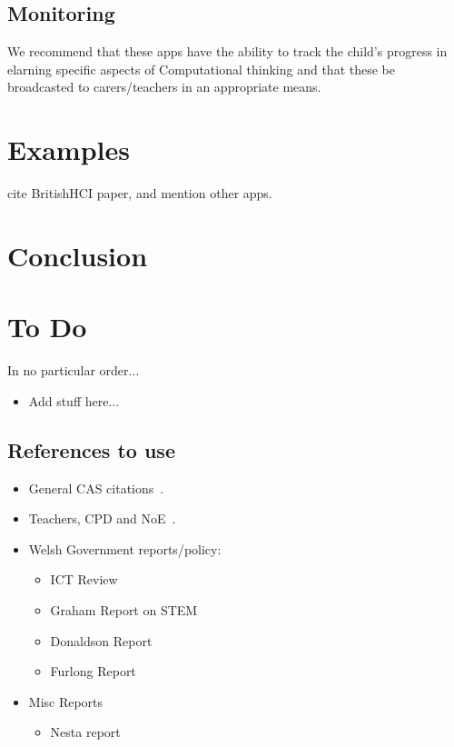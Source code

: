 \documentclass{sig-alternate}
\begin{document}
\subsection*{Monitoring}
We recommend that these apps have the ability to track the child's progress in elarning specific aspects of Computational thinking and that these be broadcasted to carers/teachers in an appropriate means. 

\section{Examples} 
cite BritishHCI paper, and mention other apps. 

\section{Conclusion}





\section*{To Do}

In no particular order...

\begin{itemize}
\item Add stuff here...
\end{itemize}

\subsection*{References to use}
\begin{itemize}
\item
General CAS
citations~\cite{crick+sentance:2011,brown-et-al-sigcse2012,brown-et-al-toce2014}.

\item
Teachers, CPD and
NoE~\cite{sentance-et-al-wipsce2012,sentance-et-al:2013,sentance-et-al:2014}.

\item
Welsh Government reports/policy:
\begin{itemize}
\item
ICT Review~\cite{welshictreview:2013}
\item
Graham Report on STEM~\cite{STEMreview:2014}
\item
Donaldson Report~\cite{Donaldson:2015}
\item
Furlong Report~\cite{Furlong:2015}
\end{itemize}

\item
Misc Reports
\begin{itemize}
\item
Nesta report~\cite{NESTA:2015}

\end{itemize}
\end{itemize}
\end{document}
